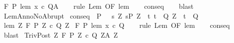 \begin{isabellebody}
\ {\isachardoublequoteopen}{\isasymGamma}{\isacharcomma}{\isasymTheta}{\isasymturnstile}\isactrlbsub {\isacharslash}F\isactrlesub \ P\ {\isacharparenleft}lem\ x\ c{\isacharparenright}\ Q{\isacharcomma}A{\isachardoublequoteclose}\isanewline
%
\isadelimproof
\ \ %
\endisadelimproof
%
\isatagproof
{}\isamarkupfalse%
\ {\isacharparenleft}rule\ Lem\ {\isacharbrackleft}OF\ lem{\isacharbrackright}{\isacharparenright}\isanewline
\ \ \isamarkupfalse%
\ conseq\isanewline
\ \ \isamarkupfalse%
\ blast%
\endisatagproof
{\isafoldproof}%
%
\isadelimproof
\isanewline
%
\endisadelimproof
\isanewline
{}\isamarkupfalse%
\ LemAnnoNoAbrupt{\isacharcolon}\isanewline
{}\ conseq{\isacharcolon}\ \ {\isachardoublequoteopen}P\ {\isasymsubseteq}\ \ {\isacharbraceleft}s{\isachardot}\ {\isasymexists}Z{\isachardot}\ s{\isasymin}P{\isacharprime}\ Z\ {\isasymand}\ {\isacharparenleft}{\isasymforall}t{\isachardot}\ t\ {\isasymin}\ Q{\isacharprime}\ Z\ {\isasymlongrightarrow}\ t\ {\isasymin}\ Q{\isacharparenright}{\isacharbraceright}{\isachardoublequoteclose}\isanewline
{}\ lem{\isacharcolon}\ {\isachardoublequoteopen}{\isasymforall}Z{\isachardot}\ {\isasymGamma}{\isacharcomma}{\isasymTheta}{\isasymturnstile}\isactrlbsub {\isacharslash}F\isactrlesub \ {\isacharparenleft}P{\isacharprime}\ Z{\isacharparenright}\ c\ {\isacharparenleft}Q{\isacharprime}\ Z{\isacharparenright}{\isacharcomma}{\isacharbraceleft}{\isacharbraceright}{\isachardoublequoteclose}\isanewline
{}\ {\isachardoublequoteopen}{\isasymGamma}{\isacharcomma}{\isasymTheta}{\isasymturnstile}\isactrlbsub {\isacharslash}F\isactrlesub \ P\ {\isacharparenleft}lem\ x\ c{\isacharparenright}\ Q{\isacharcomma}{\isacharbraceleft}{\isacharbraceright}{\isachardoublequoteclose}\isanewline
%
\isadelimproof
\ \ %
\endisadelimproof
%
\isatagproof
{}\isamarkupfalse%
\ {\isacharparenleft}rule\ Lem\ {\isacharbrackleft}OF\ lem{\isacharbrackright}{\isacharparenright}\isanewline
\ \ \isamarkupfalse%
\ conseq\isanewline
\ \ \isamarkupfalse%
\ blast%
\endisatagproof
{\isafoldproof}%
%
\isadelimproof
\isanewline
%
\endisadelimproof
\isanewline
{}\isamarkupfalse%
\ TrivPost{\isacharcolon}\ {\isachardoublequoteopen}{\isasymforall}Z{\isachardot}\ {\isasymGamma}{\isacharcomma}{\isasymTheta}{\isasymturnstile}\isactrlbsub {\isacharslash}F\isactrlesub \ {\isacharparenleft}P{\isacharprime}\ Z{\isacharparenright}\ c\ {\isacharparenleft}Q{\isacharprime}\ Z{\isacharparenright}{\isacharcomma}{\isacharparenleft}A{\isacharprime}\ Z{\isacharparenright}\isanewline

\end{isabellebody}
